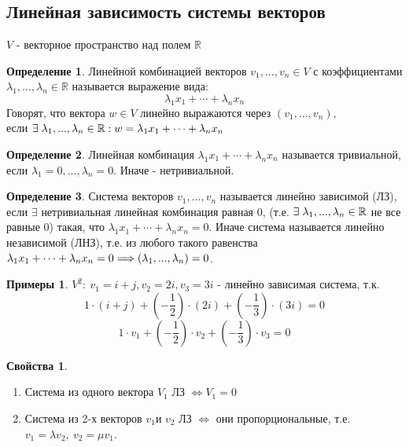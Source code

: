 \documentclass[a4paper, 12pt]{article}
\newcommand{\R}{\mathbb R}
\newcommand\tab[1][.5cm]{\hspace*{#1}}
\theoremstyle{definition}
\newtheorem*{definition}{Определение}
\newtheorem*{example}{Примеры}
\newtheorem*{properties}{Свойства}
\begin{document}
  \subsection{Линейная зависимость системы векторов}
  $V$ - векторное пространство над полем $\R$
  \begin{definition}
    Линейной комбинацией векторов $v_1,...,v_n \in V$ с коэффициентами $\lambda_1,...,\lambda_n \in \R$ называется выражение вида: 
    $$\lambda_1 x_1 + \cdots + \lambda_n x_n$$ 
    Говорят, что вектора $w \in V$ линейно выражаются через $(v_1,...,v_n)$, \\ если $\exists\tab[0.1cm]\lambda_1,...,\lambda_n \in \R: w = \lambda_1 x_1 + \cdots + \lambda_n x_n$   
  \end{definition}
  \begin{definition}
    Линейная комбинация $\lambda_1 x_1 + \cdots + \lambda_n x_n$ называется тривиальной, если $\lambda_1 = 0,...,\lambda_n = 0$. Иначе - нетривиальной.
  \end{definition}
  \begin{definition}
    Система векторов $v_1,...,v_n$ называется линейно зависимой (ЛЗ), если $\exists$ нетривиальная линейная комбинация равная 0, (т.е. $\exists \tab[0.1cm]\lambda_1,...,\lambda_n \in \R$ не все равные 0) такая, что $\lambda_1 x_1 + \cdots + \lambda_n x_n = 0$. Иначе система называется линейно независимой (ЛНЗ), т.е. из любого такого равенства $\lambda_1 x_1 + \cdots + \lambda_n x_n = 0 \\ \Longrightarrow (\lambda_1,...,\lambda_n) = 0$.
  \end{definition}
  \begin{example}
    $V^2: \ v_1 = i + j, v_2 = 2i, v_3 = 3i$ - линейно зависимая система, т.к. $$1 \cdot (i + j) + (- \frac{1}{2}) \cdot (2i) + (-\frac{1}{3}) \cdot (3i) = 0$$ 
    $$1 \cdot v_1 + (-\frac{1}{2}) \cdot v_2 + (-\frac{1}{3}) \cdot v_3 = 0$$  
  \end{example}  
  \begin{properties} \end{properties} 
    \begin{enumerate}
      \item Система из одного вектора $V_1$ ЛЗ $\Longleftrightarrow V_1 = 0$  
      \item Система из 2-х векторов $v_1 \text{и } v_2$ ЛЗ $\Longleftrightarrow$ они пропорциональные, т.е. \\$v_1 = \lambda v_2, \  v_2 = \mu v_1$. 
    \end{enumerate}
\end{document}
